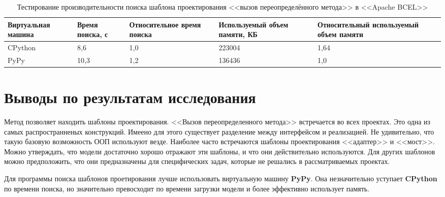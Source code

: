 \begin{table}[ht!]
    \centering
    \begin{tabularx}{\textwidth}{|X|X|X|X|X|}
        \hline
        Виртуальная машина & Время поиска, с & Относительное время поиска & Используемый объем памяти, КБ & Относительный используемый объем памяти \\
        \hline
        CPython & 8,6 & 1,0 & 223004 & 1,64 \\
        \hline
        PyPy & 10,3 & 1,2 & 136436 & 1,0 \\
        \hline
    \end{tabularx}
    \caption{Тестирование производительности поиска шаблона проектирования <<вызов переопределённого метода>> в <<Apache BCEL>>}
    \label{table:find-pattern}
\end{table}

\section{Выводы по результатам исследования}

Метод позволяет находить шаблоны проектирования.
<<Вызов переопределенного метода>> встречается во всех проектах.
Это одна из самых распространненых конструкций.
Имеено для этого существует разделение между интерфейсом и реализацией.
Не удивительно, что такую базовую возможность ООП используют везде.
Наиболее часто встречаются шаблоны проектирования <<адаптер>> и <<мост>>.
Можно утверждать, что модели достаточно хорошо отражают эти шаблоны, и что
они действительно используются.
Для других шаблонов можно предположить, что они предназначены для специфических задач,
которые не решались в рассматриваемых проектах.

Для программы поиска шаблонов проетирования лучше использовать виртуальную машину
\textbf{PyPy}.
Она незначительно уступает \textbf{CPython} по времени поиска, но значительно
превосходит по времени загрузки модели и более эффективно использует память.
